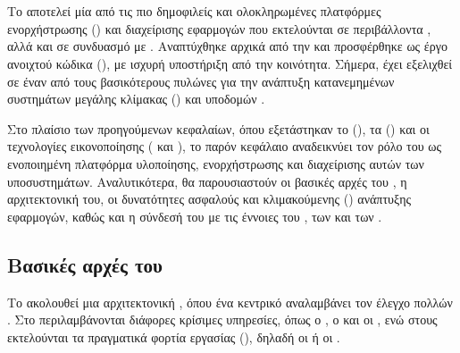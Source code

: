 \chapter{}\label{ch:kubernetes}

Το  αποτελεί μία από τις πιο δημοφιλείς και ολοκληρωμένες πλατφόρμες ενορχήστρωσης () και διαχείρισης εφαρμογών που εκτελούνται σε περιβάλλοντα , αλλά και σε συνδυασμό με . Αναπτύχθηκε αρχικά από την  και προσφέρθηκε ως έργο ανοιχτού κώδικα (), με ισχυρή υποστήριξη από την κοινότητα. Σήμερα, έχει εξελιχθεί σε έναν από τους βασικότερους πυλώνες για την ανάπτυξη κατανεμημένων συστημάτων μεγάλης κλίμακας () και υποδομών .

Στο πλαίσιο των προηγούμενων κεφαλαίων, όπου εξετάστηκαν το  (), τα  () και οι τεχνολογίες εικονοποίησης ( και ), το παρόν κεφάλαιο αναδεικνύει τον ρόλο του  ως ενοποιημένη πλατφόρμα υλοποίησης, ενορχήστρωσης και διαχείρισης αυτών των υποσυστημάτων. Αναλυτικότερα, θα παρουσιαστούν οι βασικές αρχές του , η αρχιτεκτονική του, οι δυνατότητες ασφαλούς και κλιμακούμενης () ανάπτυξης εφαρμογών, καθώς και η σύνδεσή του με τις έννοιες του , των  και των .

\section{Βασικές αρχές του }

Το  ακολουθεί μια αρχιτεκτονική , όπου ένα κεντρικό  αναλαμβάνει τον έλεγχο πολλών . Στο  περιλαμβάνονται διάφορες κρίσιμες υπηρεσίες, όπως ο , ο  και οι , ενώ στους  εκτελούνται τα πραγματικά φορτία εργασίας (), δηλαδή οι  ή οι .


